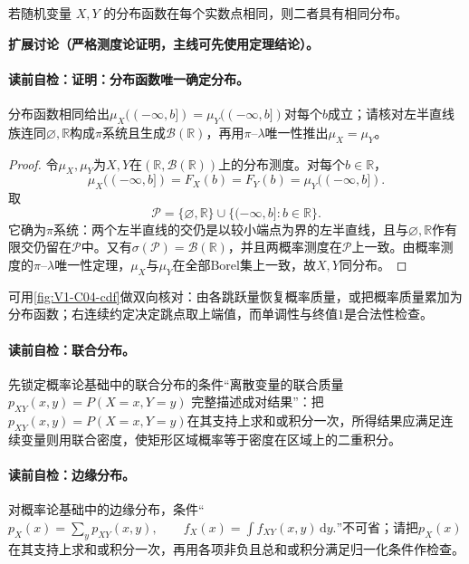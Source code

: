 \label{struct:V1-C04-CH12}
\begin{theorem}[分布函数唯一确定分布]
若随机变量 $X,Y$ 的分布函数在每个实数点相同，则二者具有相同分布。
\end{theorem}
\label{struct:V1-C04-CH15}
\textbf{扩展讨论（严格测度论证明，主线可先使用定理结论）。}
\paragraph{读前自检：证明：分布函数唯一确定分布。}分布函数相同给出$\mu_X(( -\infty,b])=\mu_Y(( -\infty,b])$对每个$b$成立；请核对左半直线族连同$\varnothing,\mathbb R$构成$\pi$系统且生成$\mathcal B(\mathbb R)$，再用$\pi$--$\lambda$唯一性推出$\mu_X=\mu_Y$。\par

\begin{proof}
令$\mu_X,\mu_Y$为$X,Y$在$(\mathbb R,\mathcal B(\mathbb R))$上的分布测度。对每个$b\in\mathbb R$，
\[
\mu_X(( -\infty,b])=F_X(b)=F_Y(b)=\mu_Y(( -\infty,b]).
\]
取
\[
\mathcal P=\{\varnothing,\mathbb R\}\cup
\{(-\infty,b]:b\in\mathbb R\}.
\]
它确为$\pi$系统：两个左半直线的交仍是以较小端点为界的左半直线，且与$\varnothing,\mathbb R$作有限交仍留在$\mathcal P$中。又有$\sigma(\mathcal P)=\mathcal B(\mathbb R)$，并且两概率测度在$\mathcal P$上一致。由概率测度的$\pi$--$\lambda$唯一性定理，$\mu_X$与$\mu_Y$在全部Borel集上一致，故$X,Y$同分布。
\end{proof}

\label{struct:V1-C04-CH19}

可用\cref{fig:V1-C04-cdf}做双向核对：由各跳跃量恢复概率质量，或把概率质量累加为分布函数；右连续约定决定跳点取上端值，而单调性与终值$1$是合法性检查。


\paragraph{读前自检：联合分布。}先锁定概率论基础中的联合分布的条件“离散变量的联合质量 $p_{XY}(x,y)=P(X=x,Y=y)$ 完整描述成对结果”：把$p_{XY}(x,y)=P(X=x,Y=y)$在其支持上求和或积分一次，所得结果应满足连续变量则用联合密度，使矩形区域概率等于密度在区域上的二重积分。\par
\paragraph{读前自检：边缘分布。}对概率论基础中的边缘分布，条件“$p_X(x)=\sum_y p_{XY}(x,y),\qquad f_X(x)=\int f_{XY}(x,y)\,\mathrm dy.$”不可省；请把$p_X(x)$在其支持上求和或积分一次，再用各项非负且总和或积分满足归一化条件作检查。\par

